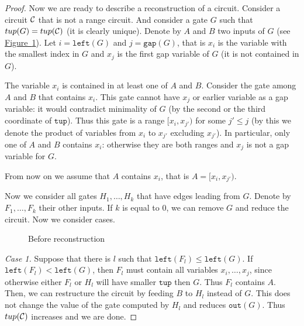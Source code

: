 \documentclass[11pt]{article}
\numberwithin{equation}{section}
\theoremstyle{definition}
\theoremstyle{plain}
\newcommand{\expref}[2]{\hyperref[#2]{#1~\ref{#2}}}
\theoremstyle{plain}\newtheorem{observation}[theorem]{Observation}
\newcommand{\lef}{\texttt{left}}
\newcommand{\gap}{\texttt{gap}}
\newcommand{\out}{\texttt{out}}
\newcommand{\tup}{\texttt{tup}}
\begin{document}
\begin{proof}[Proof]
    Now we are ready to describe a reconstruction of a circuit. Consider a circuit ${\cal C}$ that is not a range circuit. And consider a gate $G$ such that $\tup(G)=\tup({\cal C})$ (it is clearly unique). Denote by $A$ and $B$ two inputs of $G$ (see \expref{Figure}{fig:before}). Let $i=\lef(G)$ and $j=\gap(G)$, that is $x_i$ is the variable with the smallest index in $G$ and $x_j$ is the first gap variable of $G$ (it is not contained in $G$).

    The variable $x_i$ is contained in at least one of $A$ and $B$. Consider the gate among $A$ and $B$ that contains $x_i$. This gate cannot have $x_j$ or earlier variable as a gap variable: it would contradict minimality of $G$ (by the second or the third coordinate of $\tup$). Thus this gate is a range $[x_i,x_{j'})$ for some $j'\leq j$ (by this we denote the product of variables from $x_i$ to $x_{j'}$ excluding $x_{j'}$). In particular, only one of $A$ and $B$ contains $x_i$: otherwise they are both ranges and $x_j$ is not a gap variable for $G$.

    From now on we assume that $A$ contains $x_i$, that is $A=[x_i,x_{j'})$.

    Now we consider all gates $H_1,\ldots, H_k$ that have edges leading from $G$. Denote by $F_1,\ldots, F_k$ their other inputs. If $k$ is equal to $0$, we can remove $G$ and reduce the circuit. Now we consider cases.

    \begin{figure}[ht]
        \begin{center}
        \end{center}
        \caption{Before reconstruction} \label{fig:before}
    \end{figure}

    \emph{Case 1.} Suppose that there is $l$ such that $\lef(F_l) \leq \lef(G)$. If $\lef(F_l) < \lef(G)$, then $F_l$ must contain all variables $x_i, \ldots, x_j$, since otherwise either $F_l$ or $H_l$ will have smaller $\tup$ then $G$. Thus $F_l$ contains $A$. Then, we can restructure the circuit by feeding $B$ to $H_l$ instead of $G$. This does not change the value of the gate computed by $H_l$ and reduces $\out(G)$. Thus $\tup({\cal C})$ increases and we are done.


\end{proof}
\end{document}
